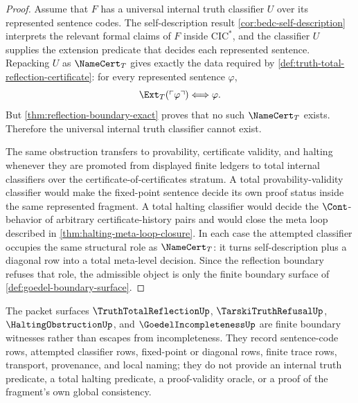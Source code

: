 \begin{proof}
Assume that $F$ has a universal internal truth classifier $U$ over its represented sentence codes. The self-description result \autoref{cor:bedc-self-description} interprets the relevant formal claims of $F$ inside $\mathrm{CIC}^{*}$, and the classifier $U$ supplies the extension predicate that decides each represented sentence. Repacking $U$ as $\NameCert_T$ gives exactly the data required by \autoref{def:truth-total-reflection-certificate}: for every represented sentence $\varphi$,
$$
\Ext_T(\ulcorner\varphi\urcorner)\Longleftrightarrow \varphi.
$$
But \autoref{thm:reflection-boundary-exact} proves that no such $\NameCert_T$ exists. Therefore the universal internal truth classifier cannot exist.

The same obstruction transfers to provability, certificate validity, and halting whenever they are promoted from displayed finite ledgers to total internal classifiers over the certificate-of-certificates stratum. A total provability-validity classifier would make the fixed-point sentence decide its own proof status inside the same represented fragment. A total halting classifier would decide the $\Cont$-behavior of arbitrary certificate-history pairs and would close the meta loop described in \autoref{thm:halting-meta-loop-closure}. In each case the attempted classifier occupies the same structural role as $\NameCert_T$: it turns self-description plus a diagonal row into a total meta-level decision. Since the reflection boundary refuses that role, the admissible object is only the finite boundary surface of \autoref{def:goedel-boundary-surface}.
\end{proof}

\begin{corollary}
\label{cor:finite-incompleteness-packets-boundary-witnesses}
The packet surfaces $\TruthTotalReflectionUp$, $\TarskiTruthRefusalUp$, $\HaltingObstructionUp$, and $\GoedelIncompletenessUp$ are finite boundary witnesses rather than escapes from incompleteness. They record sentence-code rows, attempted classifier rows, fixed-point or diagonal rows, finite trace rows, transport, provenance, and local naming; they do not provide an internal truth predicate, a total halting predicate, a proof-validity oracle, or a proof of the fragment's own global consistency.
\end{corollary}

